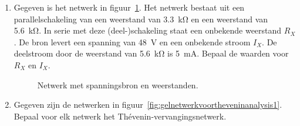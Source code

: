 \begin{enumerate}[labelindent=0pt,labelwidth=\widthof{8.88.\ },label=\textbf{\thechapter.\arabic*.},leftmargin=!,ref=\thechapter.\arabic*]
\itemstar 
\label{que:gelkarimp5}
Gegeven is het weerstandennetwerk in figuur~\ref{fig:gelkarimp1}. We stellen nu dat $R_{AB}$ gelijk is aan $R_L$, dus als we het netwerk inkijken vanuit de punten A en B dan meten we dezelfde waarde als $R_L$ (ja dat kan, zie de uitkomsten van opgave~\ref{que:gelkarimp1} en~\ref{que:gelkarimp2}). Bewijs nu dat geldt:
%
\begin{equation}
\dfrac{U_{YB}}{U_{AB}} = \dfrac{R_L-R_1}{R_L+R_1}
\end{equation}

Hint: deze is ondoenlijk, maar wel leuk. Hierbij komt echt inzicht kijken.

\item
\label{equ:gelstroomdeling1}
Gegeven is het netwerk in figuur~\ref{fig:gelstroomdeling1}. Het netwerk bestaat uit een parallelschakeling van een weerstand van \SI{3.3}{\kilo\ohm} en een weerstand van \SI{5.6}{\kilo\ohm}. In serie met deze (deel-)schakeling staat een onbekende weerstand $R_X$. De bron levert een spanning van \SI{48}{\volt} en een onbekende stroom $I_X$. De deelstroom door de weerstand van \SI{5.6}{\kilo\ohm} is \SI{5}{\milli\ampere}. Bepaal de waarden voor $R_X$ en $I_X$.

\begin{figure}[!ht]
\centering
{}
\caption{Netwerk met spanningsbron en weerstanden.}
\label{fig:gelstroomdeling1}
\end{figure}


\item
\label{que:gelthevenin1}
Gegeven zijn de netwerken in figuur~\ref{fig:gelnetwerkvoortheveninanalysis1}. Bepaal voor elk netwerk het Thévenin-vervangingsnetwerk.



\end{enumerate}
